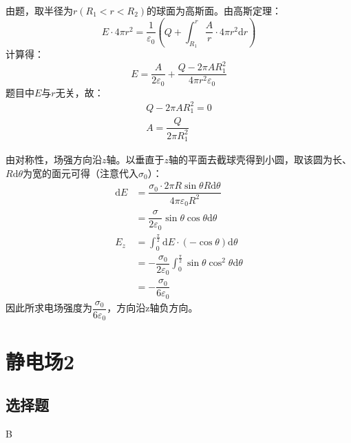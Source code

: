 \documentclass[b5paper,opensource,sourcefont,parskip]{qyxf-book}
\newcommand{\di}[1]{\mathrm{d}#1}
\begin{document}

\solve
由题，取半径为$r(R_1<r<R_2)$的球面为高斯面。由高斯定理：
\begin{equation*}
	E\cdot 4\pi r^2=\dfrac{1}{\varepsilon_0}(Q+\int_{R_1}^r\dfrac{A}{r}\cdot 4\pi r^2\di{r})
\end{equation*}
计算得：
\begin{equation*}
	E=\dfrac{A}{2\varepsilon_0}+\dfrac{Q-2\pi AR_1^2}{4\pi r^2\varepsilon_0}
\end{equation*}
题目中$E$与$r$无关，故：
\begin{gather*}
	Q-2\pi AR_1^2=0\\
	A=\dfrac{Q}{2\pi R_1^2}
\end{gather*}



\solve
由对称性，场强方向沿$z$轴。以垂直于$z$轴的平面去截球壳得到小圆，取该圆为长、$R\di{\theta}$为宽的面元可得（注意代入$\sigma_0$）：
\begin{align*}
	\di{E}&=\dfrac{\sigma_0\cdot 2\pi R\sin \theta R\di{\theta}}{4\pi \varepsilon_0 R^2}\\
	&=\dfrac{\sigma}{2\varepsilon_0}\sin\theta\cos\theta\di{\theta}\\
	E_z&=\int_0^{\frac{\pi}{2}}\di{E}\cdot(-\cos\theta)\di{\theta}\\
	&=-\dfrac{\sigma_0}{2\varepsilon_0}\int_0^{\frac{\pi}{2}}\sin\theta\cos^2\theta\di{\theta}\\
	&=-\dfrac{\sigma_0}{6\varepsilon_0}
\end{align*}
因此所求电场强度为$\dfrac{\sigma_0}{6\varepsilon_0}$，方向沿z轴负方向。

\chapter{静电场2}  %
\section{选择题}  %

B  %
\end{document}
